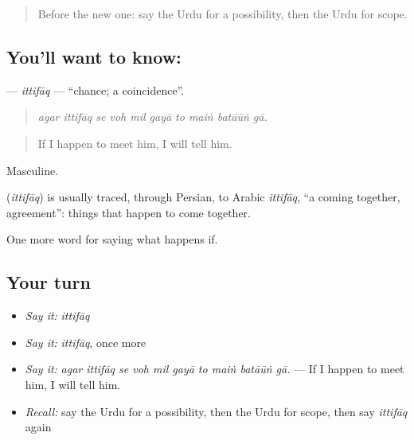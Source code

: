 \label{lesson:UR-C361-ittifaq}



\begin{quote}
Before the new one: say the Urdu for a possibility, then the Urdu for scope.
\end{quote}

\subsection*{You'll want to know: }
\textbf{} — \emph{ittifāq} — \textquotedblleft{}chance; a coincidence\textquotedblright{}.

\begin{quote}
         
\end{quote}

\begin{quote}
\emph{agar ittifāq se voh mil gayā to maiṅ batāūṅ gā.}
\end{quote}

\begin{quote}
If I happen to meet him, I will tell him.
\end{quote}

Masculine.

\begin{cousinweb}
\textbf{} (\emph{ittifāq}) is usually traced, through Persian, to Arabic \emph{ittifāq}, \textquotedblleft{}a coming together, agreement\textquotedblright{}: things that happen to come together.
\end{cousinweb}

\begin{grammarlens}[title={What you've built}]
One more word for saying what happens if.
\end{grammarlens}

\subsection*{Your turn}
\begin{itemize}
\raggedright
  \item \emph{Say it:} \emph{ittifāq}
  \item \emph{Say it:} \emph{ittifāq}, once more
  \item \emph{Say it:} \emph{agar ittifāq se voh mil gayā to maiṅ batāūṅ gā.} — If I happen to meet him, I will tell him.
  \item \emph{Recall:} say the Urdu for a possibility, then the Urdu for scope, then say \emph{ittifāq} again
\end{itemize}

